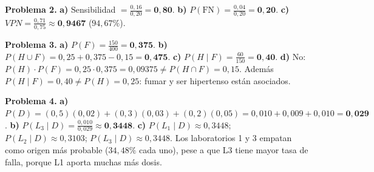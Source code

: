 \documentclass[10pt,letterpaper]{article}
\begin{document}
\medskip
\textbf{Problema 2.}
\textbf{a)} Sensibilidad $=\frac{0{,}16}{0{,}20}=\mathbf{0{,}80}$.
\textbf{b)} $P(\text{FN})=\frac{0{,}04}{0{,}20}=\mathbf{0{,}20}$.
\textbf{c)} $VPN=\frac{0{,}71}{0{,}75}\approx\mathbf{0{,}9467}$ ($94{,}67\%$).

\medskip
\textbf{Problema 3.}
\textbf{a)} $P(F)=\frac{150}{400}=\mathbf{0{,}375}$.
\textbf{b)} $P(H\cup F)=0{,}25+0{,}375-0{,}15=\mathbf{0{,}475}$.
\textbf{c)} $P(H\mid F)=\frac{60}{150}=\mathbf{0{,}40}$.
\textbf{d)} No: $P(H)\cdot P(F)=0{,}25\cdot0{,}375=0{,}09375\neq P(H\cap F)=0{,}15$. Adem\'as $P(H\mid F)=0{,}40\neq P(H)=0{,}25$: fumar y ser hipertenso est\'an asociados.

\medskip
\textbf{Problema 4.}
\textbf{a)} $P(D)=(0{,}5)(0{,}02)+(0{,}3)(0{,}03)+(0{,}2)(0{,}05)=0{,}010+0{,}009+0{,}010=\mathbf{0{,}029}$.
\textbf{b)} $P(L_3\mid D)=\frac{0{,}010}{0{,}029}\approx\mathbf{0{,}3448}$.
\textbf{c)} $P(L_1\mid D)\approx0{,}3448$; $P(L_2\mid D)\approx0{,}3103$; $P(L_3\mid D)\approx0{,}3448$. Los laboratorios 1 y 3 empatan como origen m\'as probable ($34{,}48\%$ cada uno), pese a que L3 tiene mayor tasa de falla, porque L1 aporta muchas m\'as dosis.
\end{document}

